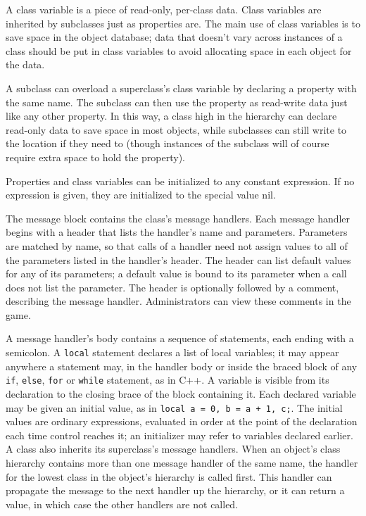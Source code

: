 \documentclass[12pt]{article}
\begin{document}
A class variable is a piece of read-only, per-class data.  Class
variables are inherited by subclasses just as properties are.  The
main use of class variables is to save space in the object database;
data that doesn't vary across instances of a class should be put in
class variables to avoid allocating space in each object for the
data.

A subclass can overload a superclass's class variable by declaring a
property with the same name.  The subclass can then use the property
as read-write data just like any other property.  In this way, a class
high in the hierarchy can declare read-only data to save space in most
objects, while subclasses can still write to the location if they need
to (though instances of the subclass will of course require extra
space to hold the property).

Properties and class variables can be initialized to any constant
expression.  If no expression is given, they are initialized to the
special value nil.

The message block contains the class's message handlers.  Each message
handler begins with a header that lists the handler's name and
parameters.  Parameters are matched by name, so that calls of a
handler need not assign values to all of the parameters listed in the
handler's header.  The header can list default values for any of its
parameters; a default value is bound to its parameter when a call does
not list the parameter.  The header is optionally followed by a
comment, describing the message handler.  Administrators can view
these comments in the game.

A message handler's body contains a sequence of statements, each
ending with a semicolon.  A {\tt local} statement declares a list of
local variables; it may appear anywhere a statement may, in the
handler body or inside the braced block of any {\tt if}, {\tt else},
{\tt for} or {\tt while} statement, as in C++.  A variable is visible
from its declaration to the closing brace of the block containing it.
Each declared variable may be given an initial value, as in
{\tt local a = 0, b = a + 1, c;}.  The initial values are ordinary
expressions, evaluated in order at the point of the declaration each
time control reaches it; an initializer may refer to variables declared
earlier.  A class also inherits
its superclass's message handlers.  When an object's class hierarchy
contains more than one message handler of the same name, the handler
for the lowest class in the object's hierarchy is called first.  This
handler can propagate the message to the next handler up the
hierarchy, or it can return a value, in which case the other handlers
are not called.
\end{document}
